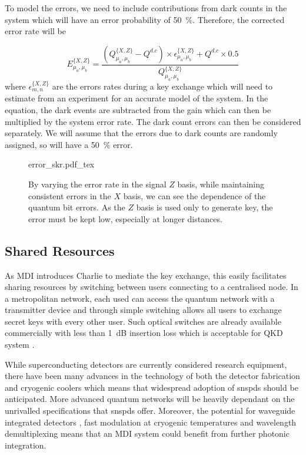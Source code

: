 To model the errors, we need to include contributions from dark counts in the system which will have an error probability of \SI{50}{\percent}. Therefore, the corrected error rate will be

\begin{equation}
	E^{\{X,Z\}}_{\mu_a,\mu_b} = \frac{\left(Q^{\{X,Z\}}_{\mu_a,\mu_b} - Q^{d.c}\right) \times \epsilon^{\{X,Z\}}_{\mu_a,\mu_b} + Q^{d.c} \times 0.5}{Q^{\{X,Z\}}_{\mu_a,\mu_b}}
\end{equation}
where $\epsilon^{\{X,Z\}}_{m,n}$ are the errors rates during a key exchange which will need to estimate from an experiment for an accurate model of the system. In the equation, the dark events are subtracted from the gain which can then be multiplied by the system error rate. The dark count errors can then be considered separately. We will assume that the errors due to dark counts are randomly assigned, so will have a \SI{50}{\percent} error.

\begin{figure}[tp]
	\centering
	\small
	\def\svgwidth{0.9\textwidth} 
	{error_skr.pdf_tex}
	\caption[Error dependence of secret key rate]{By varying the error rate in the signal $Z$ basis, while maintaining consistent errors in the $X$ basis, we can see the dependence of the quantum bit errors. As the $Z$ basis is used only to generate key, the error must be kept low, especially at longer distances.}
	\label{fig:skr_error_dependence}
\end{figure}



\subsection{Shared Resources}

As \ac{MDI} introduces Charlie to mediate the key exchange, this easily facilitates sharing resources by switching between users connecting to a centralised node. In a metropolitan network, each used can access the quantum network with a transmitter device and through simple switching allows all users to exchange secret keys with every other user. Such optical switches are already available commercially with less than \SI{1}{dB} insertion loss which is acceptable for \ac{QKD} system \cite{polatis}. 

While superconducting detectors are currently considered research equipment, there have been many advances in the technology of both the detector fabrication and cryogenic coolers which means that widespread adoption of \acp{snspd} should be anticipated. More advanced quantum networks will be heavily dependant on the unrivalled specifications that \acp{snspd} offer. Moreover, the potential for waveguide integrated detectors \cite{sprengers2011, vetter2016, yun2019}, fast modulation at cryogenic temperatures \cite{eltes2019} and wavelength demultiplexing \cite{sugita2000} means that an \ac{MDI} system could benefit from further photonic integration.

